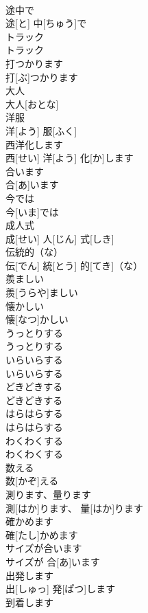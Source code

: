 \documentclass[8pt]{extreport}
\begin{document}
\begin{CJK}{UTF8}{min}
\\	途中で	
\\	途[と] 中[ちゅう]で		
\\	トラック	
\\	トラック		
\\	打つかります	
\\	打[ぶ]つかります		
\\	大人	
\\	大人[おとな]		
\\	洋服	
\\	洋[よう] 服[ふく]		
\\	西洋化します	
\\	西[せい] 洋[よう] 化[か]します		
\\	合います	
\\	合[あ]います		
\\	今では	
\\	今[いま]では		
\\	成人式	
\\	成[せい] 人[じん] 式[しき]		
\\	伝統的（な）	
\\	伝[でん] 統[とう] 的[てき]（な）		
\\	羨ましい	
\\	羨[うらや]ましい		
\\	懐かしい	
\\	懐[なつ]かしい		
\\	うっとりする	
\\	うっとりする		
\\	いらいらする	
\\	いらいらする		
\\	どきどきする	
\\	どきどきする		
\\	はらはらする	
\\	はらはらする		
\\	わくわくする	
\\	わくわくする		
\\	数える	
\\	数[かぞ]える		
\\	測ります、量ります	
\\	測[はか]ります、 量[はか]ります		
\\	確かめます	
\\	確[たし]かめます		
\\	サイズが合います	
\\	サイズが 合[あ]います		
\\	出発します	
\\	出[しゅっ] 発[ぱつ]します		
\\	到着します	

\end{CJK}
\end{document}
